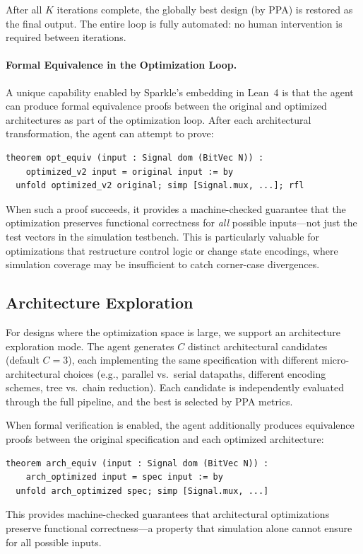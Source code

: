 After all $K$ iterations complete, the globally best design (by PPA) is restored as the final output. The entire loop is fully automated: no human intervention is required between iterations.

\paragraph{Formal Equivalence in the Optimization Loop.}
A unique capability enabled by Sparkle's embedding in Lean~4 is that the agent can produce formal equivalence proofs between the original and optimized architectures as part of the optimization loop. After each architectural transformation, the agent can attempt to prove:
\begin{small}
\begin{verbatim}
theorem opt_equiv (input : Signal dom (BitVec N)) :
    optimized_v2 input = original input := by
  unfold optimized_v2 original; simp [Signal.mux, ...]; rfl
\end{verbatim}
\end{small}
When such a proof succeeds, it provides a machine-checked guarantee that the optimization preserves functional correctness for \emph{all} possible inputs---not just the test vectors in the simulation testbench. This is particularly valuable for optimizations that restructure control logic or change state encodings, where simulation coverage may be insufficient to catch corner-case divergences.

\subsection{Architecture Exploration}
\label{sec:arch_explore}

For designs where the optimization space is large, we support an architecture exploration mode. The agent generates $C$ distinct architectural candidates (default $C{=}3$), each implementing the same specification with different micro-architectural choices (e.g., parallel vs.\ serial datapaths, different encoding schemes, tree vs.\ chain reduction). Each candidate is independently evaluated through the full pipeline, and the best is selected by PPA metrics.

When formal verification is enabled, the agent additionally produces equivalence proofs between the original specification and each optimized architecture:
\begin{small}
\begin{verbatim}
theorem arch_equiv (input : Signal dom (BitVec N)) :
    arch_optimized input = spec input := by
  unfold arch_optimized spec; simp [Signal.mux, ...]
\end{verbatim}
\end{small}
This provides machine-checked guarantees that architectural optimizations preserve functional correctness---a property that simulation alone cannot ensure for all possible inputs.
